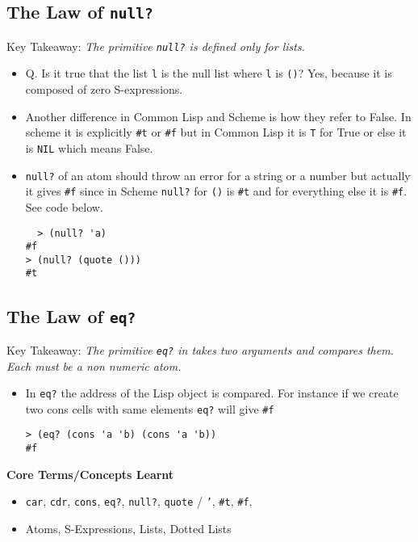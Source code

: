 \documentclass[11pt]{article}
\begin{document}
\subsection{The Law of \texttt{null?}}
\label{sec:org7b5490d}
Key Takeaway:
\emph{The primitive \texttt{null?} is defined only for lists.}

\vspace{1em}

\begin{itemize}
\item Q. Is it true that the list \texttt{l} is the null list where \texttt{l} is \texttt{()}? Yes, because it is  composed of
zero S-expressions.
\item Another difference in Common Lisp and Scheme is how they refer to False. In scheme it is explicitly \texttt{\#t} or \texttt{\#f} but
in Common Lisp it is \texttt{T} for True or else it is \texttt{NIL} which means False.
\item \texttt{null?} of an atom should throw an error for a string or a number but actually it gives \texttt{\#f} since in Scheme \texttt{null?}
for \texttt{()} is \texttt{\#t} and for everything else it is \texttt{\#f}. See code below.
\begin{verbatim}
  > (null? 'a)
#f
> (null? (quote ()))
#t

\end{verbatim}
\end{itemize}

\subsection{The Law of \texttt{eq?}}
\label{sec:org70a94b4}
Key Takeaway:
\emph{The primitive \texttt{eq?} in takes two arguments and compares them. Each must be a non numeric atom.}

\vspace{1em}

\begin{itemize}
\item In \texttt{eq?} the address of the Lisp object is compared. For instance if we create two cons cells with same elements
\texttt{eq?} will give \texttt{\#f}
\begin{verbatim}
> (eq? (cons 'a 'b) (cons 'a 'b))
#f

\end{verbatim}
\end{itemize}

\textbf{Core Terms/Concepts Learnt}
\begin{itemize}
\item \texttt{car}, \texttt{cdr}, \texttt{cons}, \texttt{eq?}, \texttt{null?}, \texttt{quote} / \texttt{'}, \texttt{\#t}, \texttt{\#f},
\item Atoms, S-Expressions, Lists, Dotted Lists
\end{itemize}
\end{document}
